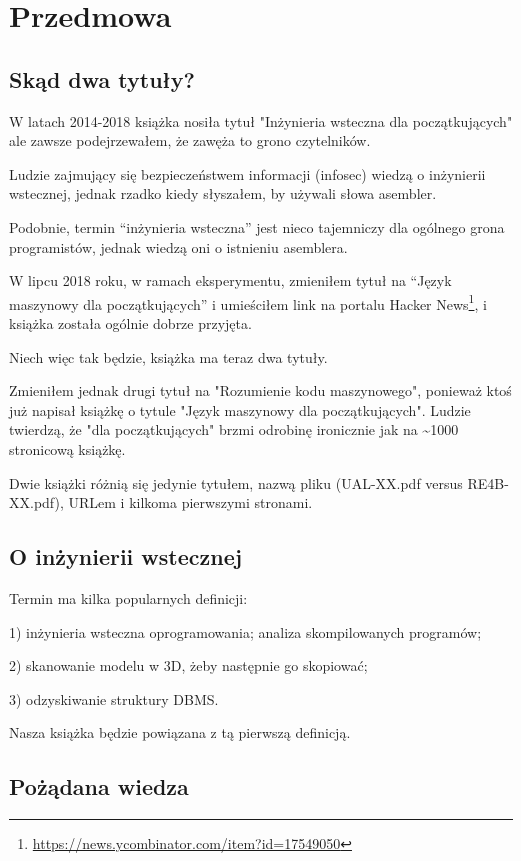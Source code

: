 \section*{Przedmowa}

\subsection*{Skąd dwa tytuły?}
\label{TwoTitles}

W latach 2014-2018 książka nosiła tytuł "Inżynieria wsteczna dla początkujących" ale zawsze podejrzewałem, że zawęża to grono czytelników.

Ludzie zajmujący się bezpieczeństwem informacji (infosec) wiedzą o inżynierii wstecznej, jednak rzadko kiedy słyszałem, by używali słowa asembler.

Podobnie, termin ``inżynieria wsteczna'' jest nieco tajemniczy dla ogólnego grona programistów, jednak wiedzą oni o istnieniu asemblera.

W lipcu 2018 roku, w ramach eksperymentu, zmieniłem tytuł na ``Język maszynowy dla początkujących''
i umieściłem link na portalu Hacker News\footnote{\url{https://news.ycombinator.com/item?id=17549050}}, i książka została ogólnie dobrze przyjęta.

Niech więc tak będzie, książka ma teraz dwa tytuły.

Zmieniłem jednak drugi tytuł na "Rozumienie kodu maszynowego",
ponieważ ktoś już napisał książkę o tytule "Język maszynowy dla początkujących".
Ludzie twierdzą, że "dla początkujących" brzmi odrobinę ironicznie jak na \textasciitilde{}1000 stronicową książkę.

Dwie książki różnią się jedynie tytułem, nazwą pliku (UAL-XX.pdf versus RE4B-XX.pdf),
URLem i kilkoma pierwszymi stronami.

\subsection*{O inżynierii wstecznej}

Termin  ma kilka popularnych definicji:

1) inżynieria wsteczna oprogramowania; analiza skompilowanych programów; 

2) skanowanie modelu w 3D, żeby następnie go skopiować;

3) odzyskiwanie struktury \ac{DBMS}.

Nasza książka będzie powiązana z tą pierwszą definicją.

\subsection*{Pożądana wiedza}

